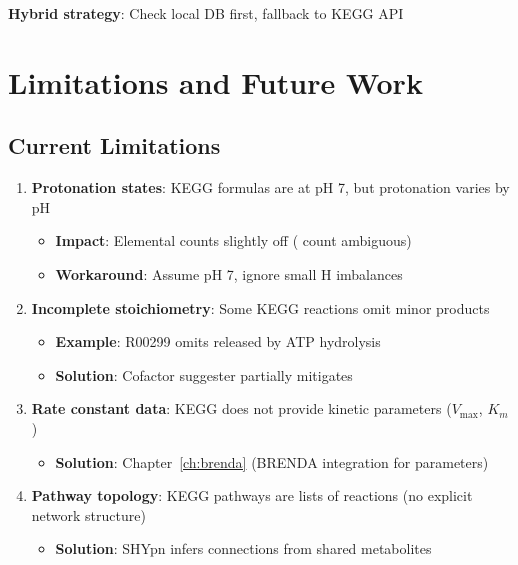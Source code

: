 \textbf{Hybrid strategy}: Check local DB first, fallback to KEGG API

\section{Limitations and Future Work}
\label{sec:kegg-limitations}

\subsection{Current Limitations}
\label{subsec:kegg-current-limitations}

\begin{enumerate}
    \item \textbf{Protonation states}: KEGG formulas are at pH 7, but protonation varies by pH
    \begin{itemize}
        \item \textbf{Impact}: Elemental counts slightly off ( count ambiguous)
        \item \textbf{Workaround}: Assume pH 7, ignore small H imbalances
    \end{itemize}
    
    \item \textbf{Incomplete stoichiometry}: Some KEGG reactions omit minor products
    \begin{itemize}
        \item \textbf{Example}: R00299 omits  released by ATP hydrolysis
        \item \textbf{Solution}: Cofactor suggester partially mitigates
    \end{itemize}
    
    \item \textbf{Rate constant data}: KEGG does not provide kinetic parameters ($V_{\max}$, $K_m$)
    \begin{itemize}
        \item \textbf{Solution}: Chapter~\ref{ch:brenda} (BRENDA integration for parameters)
    \end{itemize}
    
    \item \textbf{Pathway topology}: KEGG pathways are lists of reactions (no explicit network structure)
    \begin{itemize}
        \item \textbf{Solution}: SHYpn infers connections from shared metabolites
    \end{itemize}
\end{enumerate}

